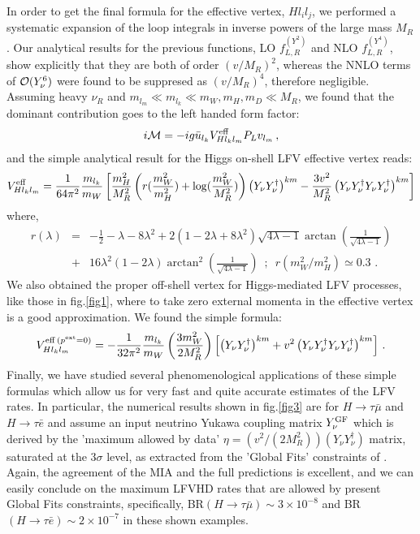 \documentclass{PoS}
\begin{document}
In order to get the final formula for the effective vertex, $Hl_il_j$,  we performed a systematic expansion of the loop integrals in inverse powers of the large mass $M_R$. Our analytical results for the previous functions,  LO $f_{L,R}^{(Y^{2})}$ and NLO $f_{L,R}^{(Y^{4})}$, show explicitly that they are both of order 
$(v/M_R)^2$, whereas the NNLO terms of  ${\cal O}(Y_\nu^6)$ were found to be suppresed as $(v/M_R)^4$, therefore negligible. Assuming heavy $\nu_R$ and  $m_{l_m}\ll m_{l_k} \ll m_W, m_H, m_D \ll M_R$, we found that the dominant contribution goes to the left handed form factor:
 \begin{equation}
i {\cal M} = -i g \bar{u}_{l_k} V_{Hl_{k}l_{m}}^{\rm eff} P_L  v_{l_m} \, ,
\end{equation}
and the simple analytical result for the Higgs on-shell LFV effective vertex reads:
\begin{equation}
V_{Hl_{k}l_{m}}^{\rm eff}=\frac{1}{64 \pi^{2}} \frac{m_{l_k}}{m_{W}}  \left[  \frac{m_{H}^{2}}{M_{R}^{2}}
\left( r(\frac{m_{W}^{2}}{m_{H}^{2}}) +\log(\frac{m_{W}^{2}}{M_{R}^{2}}) \right) \left(Y_{\nu} Y_{\nu}^{\dagger}\right)^{km} - \frac{3v^{2}} {M_{R}^{2}} \left(Y_{\nu} Y_{\nu}^{\dagger} Y_{\nu} Y_{\nu}^{\dagger} \right)^{km} \right]
\end{equation}
where,
 \begin{eqnarray}
r(\lambda)&=&-\frac{1}{2} -\lambda -8\lambda^{2} +2(1-2\lambda +8\lambda^{2})\sqrt{4\lambda-1}\arctan\left(\frac{1}{\sqrt{4\lambda-1}}\right)
\nonumber \\ &+& 16\lambda^{2}(1-2\lambda)\arctan^2\left(\frac{1}{\sqrt{4\lambda-1}}\right) 
\,\,\,;\,\,\, r(m_W^2/m_H^2) \simeq 0.3 \,\,.
\label{rlambda}
\end{eqnarray}
We also obtained the proper off-shell vertex for Higgs-mediated LFV processes, like those in fig.\ref{fig1}, where to take zero external momenta in the effective vertex is a good approximation. We found the simple formula:
\begin{eqnarray}
V_{Hl_{k}l_{m}}^{{\rm eff} \, (p^{{\rm ext}}=0)} = -\frac{1}{32 \pi^{2}} \frac{m_{l_k}}{m_{W}} \left(\frac{3m_{W}^{2}}{2M_{R}^{2}} \right) \left[ \left(Y_{\nu} Y_{\nu}^{\dagger}\right)^{km} + v^{2} \left(Y_{\nu} Y_{\nu}^{\dagger} Y_{\nu} Y_{\nu}^{\dagger} \right)^{km} \right]  \,.
\end{eqnarray}
Finally, we have studied several phenomenological applications of these simple formulas which allow us for very fast and quite accurate estimates of the LFV rates. In particular, the numerical results shown in fig.\ref{fig3} are for $H \to \tau \bar \mu$ and 
$H \to \tau \bar e$ and assume an input neutrino Yukawa coupling matrix $Y_\nu^{\rm GF}$ which is derived by the 'maximum allowed by data' $\eta = (v^2/(2M_R^2))(Y_\nu Y_\nu^\dagger)$ matrix, saturated at the $3\sigma$ level, as extracted from the 'Global Fits' constraints of \cite{Fernandez-Martinez:2016lgt}. Again, the agreement of the MIA and the full predictions is excellent, and we can easily conclude on the maximum LFVHD rates that are allowed by present Global Fits constraints, specifically,  BR$(H \to \tau \bar \mu) \sim 3 \times 10^{-8}$ and BR$(H \to \tau \bar e) \sim 2 \times 10^{-7}$ in these shown examples.  
\end{document}
